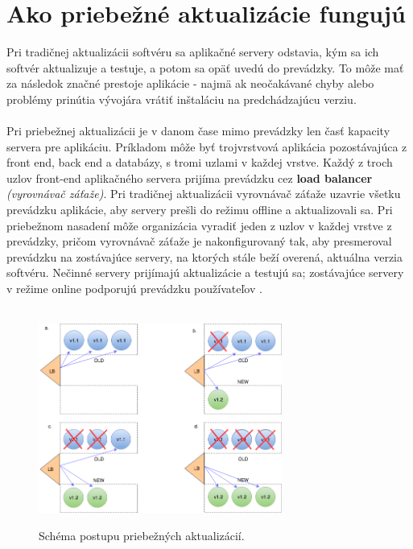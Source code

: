\documentclass[10pt,twoside,slovak,a4paper]{article}
\begin{document}
\section{Ako priebežné aktualizácie fungujú}\label{2}
Pri tradičnej aktualizácii softvéru sa aplikačné servery odstavia, kým sa ich softvér aktualizuje a testuje, a potom sa opäť uvedú do prevádzky. To môže mať za následok značné prestoje aplikácie - najmä ak neočakávané chyby alebo problémy prinútia vývojára vrátiť inštaláciu na predchádzajúcu verziu.\\\\
Pri priebežnej aktualizácii je v danom čase mimo prevádzky len časť kapacity servera pre aplikáciu. Príkladom môže byť trojvrstvová aplikácia pozostávajúca z front end, back end a databázy,  s tromi uzlami v každej vrstve. Každý z troch uzlov front-end aplikačného servera prijíma prevádzku cez \textbf{load balancer} \textit{ (vyrovnávač záťaže)}. Pri tradičnej aktualizácii vyrovnávač záťaže uzavrie všetku prevádzku aplikácie, aby servery prešli do režimu offline a aktualizovali sa. Pri priebežnom nasadení môže organizácia vyradiť jeden z uzlov v každej vrstve z prevádzky, pričom vyrovnávač záťaže je nakonfigurovaný tak, aby presmeroval prevádzku na zostávajúce servery, na ktorých stále beží overená, aktuálna verzia softvéru. Nečinné servery prijímajú aktualizácie a testujú sa; zostávajúce servery v režime online podporujú prevádzku používateľov\cite{web1} .\\\\

\begin{figure}[htbp]
  \centering
  \includegraphics[width=8cm]{RampedDep1.png}
  \caption{Schéma postupu priebežných aktualizácií.}
  \label{4}
  \cite{picture}
\end{figure}
\end{document}
